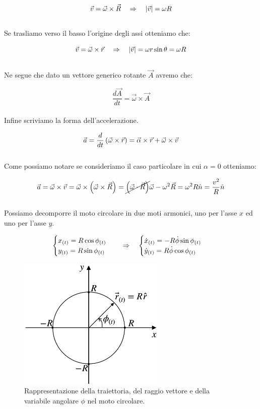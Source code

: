 \begin{equation}
    \vec v = \vec\omega\times\vec R\quad\Rightarrow\quad \left| \vec v \right|  = \omega R
\end{equation}
\\
Se trasliamo verso il basso l'origine degli assi otteniamo che:

\begin{equation}
    \vec v = \vec\omega\times\vec r\quad\Rightarrow\quad \left| \vec v \right|  = \omega r\sin\theta = \omega R
\label{eq:v(w)}
\end{equation}
\\
Ne segue che dato un vettore generico rotante $\vec A$ avremo che:

\begin{equation}
    \frac{d\vec A}{dt} = \vec\omega\times\vec A
\label{eq:rotantvector}
\end{equation}
\\
Infine scriviamo la forma dell'accelerazione.

\begin{equation}
    \vec a = \frac d{dt}\left(\vec\omega\times\vec r\right) =
    \vec \alpha\times \vec r + \vec\omega\times\vec v
\label{eq:a_vec}
\end{equation}
\\
Come possiamo notare se consideriamo il caso particolare in cui $\alpha = 0$
otteniamo:

\begin{equation}
    \vec a = \vec \omega\times\vec v = \vec \omega\times\left( \vec\omega\times
    \vec R\right) = \cancel{\left(\vec\omega\cdot\vec R\right)}\vec\omega - \omega^2\vec R
    = \omega^2R\hat n = \frac{v^2}R\hat n
\label{eq:an_vec}
\end{equation}
\\
Possiamo decomporre il moto circolare in due moti armonici, uno per l'asse $x$ ed uno per l'asse $y$.

\begin{equation}
    \begin{cases}
        x_{(t)} = R\cos\phi_{(t)}\\
        y_{(t)} = R\sin\phi_{(t)}\\
    \end{cases}\quad\Rightarrow\quad
    \begin{cases}
        \dot x_{(t)} = -R\dot\phi\sin\phi_{(t)}\\
        \dot y_{(t)} = R\dot\phi\cos\phi_{(t)}
    \end{cases}
\label{eq:components}
\end{equation}

\begin{figure}[htbp]
    \centering
        \includegraphics[width=7cm]{images/circ.png}
        \caption{Rappresentazione della traiettoria, del raggio vettore e della variabile angolare $\phi$ nel moto circolare.}
\label{fig:circ}
\end{figure}